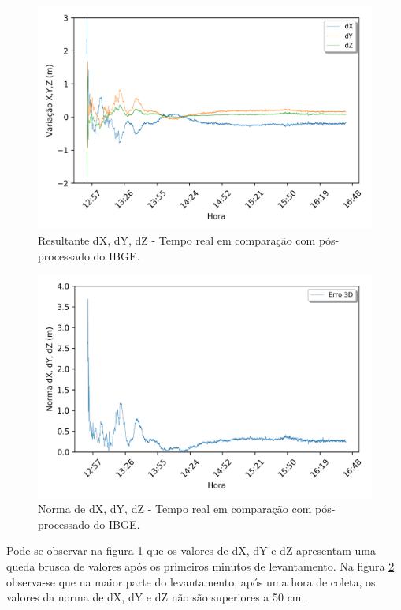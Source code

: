 \begin{figure}[H]
\centering
\includegraphics[scale=0.9]{data/Graphics/RJ_T20712/RJ_T20712_comparison_graphic_xyz.png}
\caption{Resultante dX, dY, dZ - Tempo real em comparação com pós-processado do IBGE.}
\label{comp_xyz_20712}
\end{figure}


\begin{figure}[H]
\centering
\includegraphics[scale=0.9]{data/Graphics/RJ_T20712/RJ_T20712_comparison_graphic_result.png}
\caption{Norma de dX, dY, dZ - Tempo real em comparação com pós-processado do IBGE.}
\label{comp_norma_20712}
\end{figure}

Pode-se observar na figura \ref{comp_xyz_20712} que os valores de dX, dY e dZ apresentam uma queda brusca de valores após os primeiros minutos de levantamento. Na figura \ref{comp_norma_20712} observa-se que na maior parte do levantamento, após uma hora de coleta, os valores da norma de dX, dY e dZ não são superiores a 50 cm.



